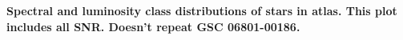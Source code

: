 {\bf  Spectral and luminosity class distributions of stars in atlas. This plot includes all SNR. Doesn't repeat GSC 06801-00186.\label{fig:hiso-spt-type}}